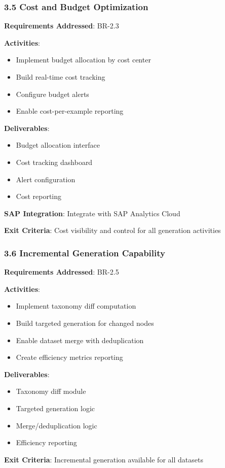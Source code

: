 \subsubsection{3.5 Cost and Budget Optimization}

\begin{tcolorbox}[colback=orange!5,colframe=orange!70,title=3.5 Cost Management]
\textbf{Requirements Addressed}: BR-2.3

\textbf{Activities}:
\begin{itemize}
  \item Implement budget allocation by cost center
  \item Build real-time cost tracking
  \item Configure budget alerts
  \item Enable cost-per-example reporting
\end{itemize}

\textbf{Deliverables}:
\begin{itemize}
  \item Budget allocation interface
  \item Cost tracking dashboard
  \item Alert configuration
  \item Cost reporting
\end{itemize}

\textbf{SAP Integration}: Integrate with SAP Analytics Cloud

\textbf{Exit Criteria}: Cost visibility and control for all generation activities
\end{tcolorbox}

\subsubsection{3.6 Incremental Generation Capability}

\begin{tcolorbox}[colback=orange!5,colframe=orange!70,title=3.6 Dataset Evolution]
\textbf{Requirements Addressed}: BR-2.5

\textbf{Activities}:
\begin{itemize}
  \item Implement taxonomy diff computation
  \item Build targeted generation for changed nodes
  \item Enable dataset merge with deduplication
  \item Create efficiency metrics reporting
\end{itemize}

\textbf{Deliverables}:
\begin{itemize}
  \item Taxonomy diff module
  \item Targeted generation logic
  \item Merge/deduplication logic
  \item Efficiency reporting
\end{itemize}

\textbf{Exit Criteria}: Incremental generation available for all datasets
\end{tcolorbox}

